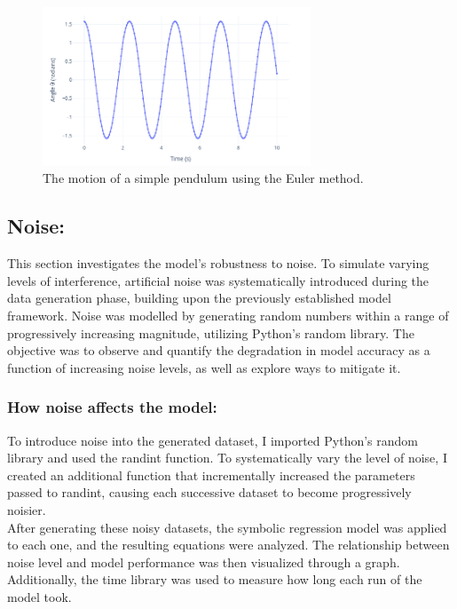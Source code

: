 \documentclass{article}
\begin{document}
\begin{figure}[H]
    \centering
    \includegraphics[width=8cm]{pendulum_simulation}
    \caption{The motion of a simple pendulum using the Euler method.} %
    \label{fig:sr_flow}
\end{figure}



\subsection{Noise: }

    This section investigates the model's robustness to noise. To simulate varying levels of interference, artificial noise was systematically introduced during the data generation phase, building upon the previously established model framework. Noise was modelled by generating random numbers within a range of progressively increasing magnitude, utilizing Python's random library. The objective was to observe and quantify the degradation in model accuracy as a function of increasing noise levels, as well as explore ways to mitigate it.\\


\subsubsection{How noise affects the model: }

To introduce noise into the generated dataset, I imported Python’s random library and used the randint function. To systematically vary the level of noise, I created an additional function that incrementally increased the parameters passed to randint, causing each successive dataset to become progressively noisier.\\

After generating these noisy datasets, the symbolic regression model was applied to each one, and the resulting equations were analyzed. The relationship between noise level and model performance was then visualized through a graph. Additionally, the time library was used to measure how long each run of the model took.\\
\end{document}

